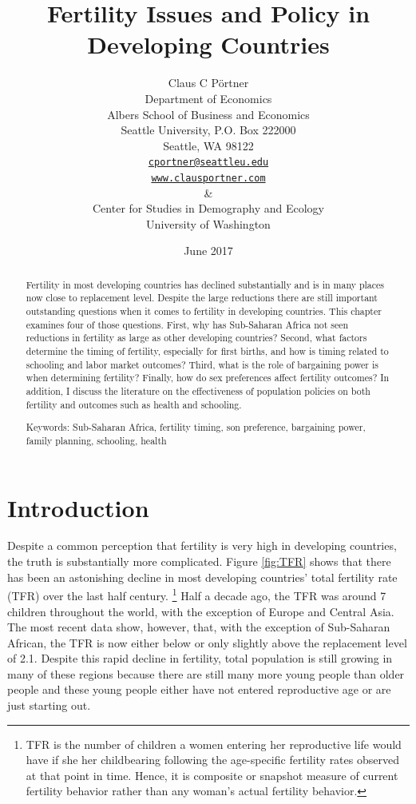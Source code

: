 \documentclass[letterpaper,12pt]{article}
\title{Fertility Issues and Policy in Developing Countries}
\author{Claus C P\"ortner\\
    Department of Economics\\
    Albers School of Business and Economics\\
    Seattle University, P.O. Box 222000\\
    Seattle, WA 98122\\
    \href{mailto:cportner@seattleu.edu}{\texttt{cportner@seattleu.edu}}\\
    \href{http://www.clausportner.com}{\texttt{www.clausportner.com}}\\
    \& \\
    Center for Studies in Demography and Ecology \\
    University of Washington\\ \vspace{2cm}
    }
\date{June 2017}
\begin{document}
\maketitle
\thispagestyle{empty}

\begin{abstract}

Fertility in most developing countries has declined substantially 
and is in many places now close to replacement level.
Despite the large reductions there are still important outstanding 
questions when it comes to fertility in developing countries.
This chapter examines four of those questions.
First, why has Sub-Saharan Africa not seen reductions in 
fertility as large as other developing countries?
Second, what factors determine the timing of fertility, especially
for first births, and how is timing related to schooling and labor
market outcomes?
Third, what is the role of bargaining power is when determining
fertility?
Finally, how do sex preferences affect fertility outcomes?
In addition, I discuss the literature on the effectiveness 
of population policies on both fertility and outcomes such
as health and schooling.

\noindent Keywords: Sub-Saharan Africa, fertility timing, son preference, 
bargaining power, family planning, schooling, health

\end{abstract}

\newpage 

\doublespacing

\section{Introduction}

Despite a common perception that fertility is very high in developing
countries, the truth is substantially more complicated. 
Figure \ref{fig:TFR} shows that there has been an astonishing decline in
most developing countries' total fertility rate (TFR) over the last half
century.%
\footnote{
TFR is the number of children a women entering her reproductive life
would have if she her childbearing following the age-specific fertility
rates observed at that point in time. 
Hence, it is composite or snapshot measure of current fertility behavior
rather than any woman's actual fertility behavior.
} 
Half a decade ago, the TFR was around 7 children throughout the world,
with the exception of Europe and Central Asia. 
The most recent data show, however, that, with the exception of
Sub-Saharan African, the TFR is now either below or only slightly above
the replacement level of 2.1. 
Despite this rapid decline in fertility, total population is still
growing in many of these regions because there are still many more young
people than older people and these young people either have not entered
reproductive age or are just starting out.
\end{document}
